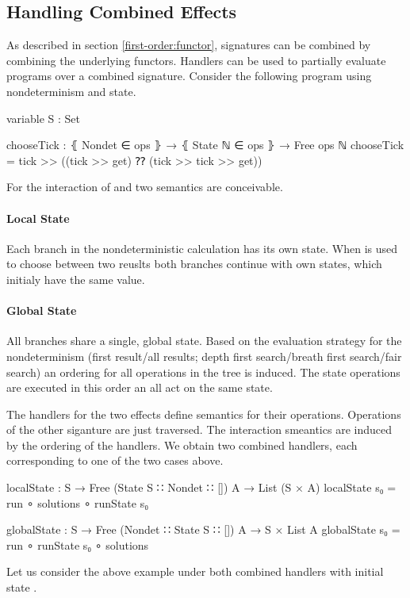 \subsection{Handling Combined Effects}

As described in section \ref{first-order:functor}, signatures can be combined by
combining the underlying functors.
Handlers can be used to partially evaluate programs over a combined signature.
Consider the following program using nondeterminism and state.

\begin{code}[hide]
variable
  S : Set
\end{code}
\begin{code}
chooseTick : ⦃ Nondet ∈ ops ⦄ → ⦃ State ℕ ∈ ops ⦄ → Free ops ℕ
chooseTick = tick >> ((tick >> get) ⁇ (tick >> tick >> get))
\end{code}
For the interaction of  and  two
semantics are conceivable.
\paragraph{Local State}
Each branch in the nondeterministic calculation has its own state.
When  is used to choose between two reuslts both branches
continue with own states, which initialy have the same value.
\paragraph{Global State}
All branches share a single, global state.
Based on the evaluation strategy for the nondeterminism (first result/all
results; depth first search/breath first search/fair search) an ordering for all
operations in the tree is induced.
The state operations are executed in this order an all act on the same state.

The handlers for the two effects define semantics for their operations.
Operations of the other siganture are just traversed.
The interaction smeantics are induced by the ordering of the handlers.
We obtain two combined handlers, each corresponding to one of the two cases
above.

\begin{code}
localState : S → Free (State S ∷ Nondet ∷ []) A → List (S × A)
localState s₀ = run ∘ solutions ∘ runState s₀

globalState : S → Free (Nondet ∷ State S ∷ []) A → S × List A
globalState s₀ = run ∘ runState s₀ ∘ solutions
\end{code}
Let us consider the above example under both combined handlers with initial
state .

